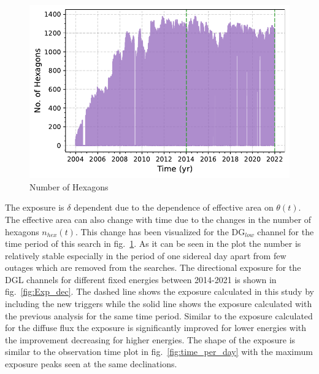 \begin{figure}[t!]
  \centering
  \includegraphics[width=14.5cm]{thesis_figures/PointLimits/Hexagons_2004_2021_forSrijan.pdf}
  \caption{Number of Hexagons}
  \label{fig:Hexagon_time}
\end{figure}

The exposure is $\delta$ dependent due to the dependence of effective area on $\theta(t)$. The effective area can also change with time due to the changes in the number of hexagons $n_{hex}(t)$. This change has been visualized for the DG$_{low}$ channel for the time period of this search in fig.~\ref{fig:Hexagon_time}. As it can be seen in the plot the number is relatively stable especially in the period of one sidereal day apart from few outages which are removed from the searches. The directional exposure for the DGL channels for different fixed energies between 2014-2021 is shown in fig.~\ref{fig:Exp_dec}. The dashed line shows the exposure calculated in this study by including the new triggers while the solid line shows the exposure calculated with the previous analysis for the same time period. Similar to the exposure calculated for the diffuse flux the exposure is significantly improved for lower energies with the improvement decreasing for higher energies. The shape of the exposure is similar to the observation time plot in fig.~\ref{fig:time_per_day} with the maximum exposure peaks seen at the same declinations. 


